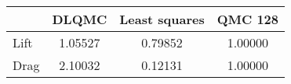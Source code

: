 \begin{tabular}{|l|c|c|c|}
\hline
 &DLQMC&Least squares&QMC 128\\ 
\hline

Lift & 1.05527 & 0.79852 & 1.00000\\ 
\hline
Drag & 2.10032 & 0.12131 & 1.00000\\ 
\hline
\end{tabular}

